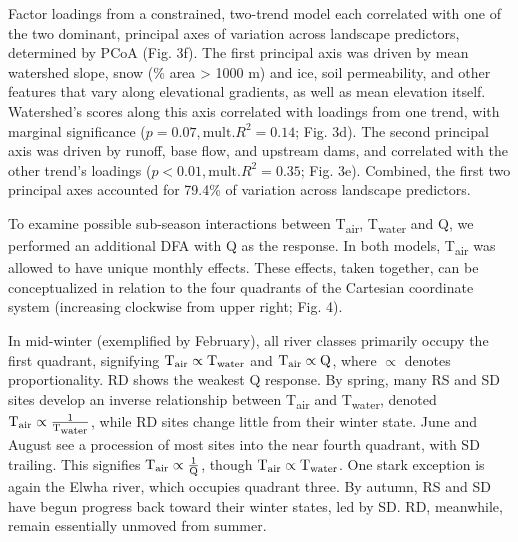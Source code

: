 \documentclass[notitlepage]{article}
\begin{document}
Factor loadings from a constrained, two-trend model each correlated with one of the two dominant, principal axes of variation across landscape predictors, determined by PCoA (Fig. 3f). The first principal axis was driven by mean watershed slope, snow (\% area > 1000 m) and ice, soil permeability, and other features that vary along elevational gradients, as well as mean elevation itself. Watershed's scores along this axis correlated with loadings from one trend, with marginal significance ($p=0.07, \textrm{mult.} R^2=0.14$; Fig. 3d). The second principal axis was driven by runoff, base flow, and upstream dams, and correlated with the other trend's loadings ($p<0.01, \textrm{mult.} R^2=0.35$; Fig. 3e). Combined, the first two principal axes accounted for 79.4\% of variation across landscape predictors.

To examine possible sub-season interactions between T\textsubscript{air}, T\textsubscript{water} and Q, we performed an additional DFA with Q as the response. In both models, T\textsubscript{air} was allowed to have unique monthly effects. These effects, taken together, can be conceptualized in relation to the four quadrants of the Cartesian coordinate system (increasing clockwise from upper right; Fig. 4).

In mid-winter (exemplified by February), all river classes primarily occupy the first quadrant, signifying $\textrm{T}\textsubscript{air} \propto \textrm{T}\textsubscript{water}$ and $\textrm{T}\textsubscript{air} \propto \textrm{Q}$, where $\propto$ denotes proportionality. RD shows the weakest Q response. By spring, many RS and SD sites develop an inverse relationship between T\textsubscript{air} and T\textsubscript{water}, denoted $\textrm{T}\textsubscript{air} \propto \frac{1}{\textrm{T}\textsubscript{water}}$, while RD sites change little from their winter state. June and August see a procession of most sites into the near fourth quadrant, with SD trailing. This signifies $\textrm{T}\textsubscript{air} \propto \frac{1}{\textrm{Q}}$, though $\textrm{T}\textsubscript{air} \propto \textrm{T}\textsubscript{water}$. One stark exception is again the Elwha river, which occupies quadrant three. By autumn, RS and SD have begun progress back toward their winter states, led by SD. RD, meanwhile, remain essentially unmoved from summer.
\end{document}
